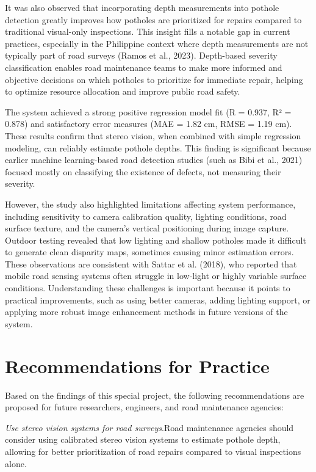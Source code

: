 It was also observed that incorporating depth measurements into pothole detection greatly improves how potholes are prioritized for repairs compared to traditional visual-only inspections. This insight fills a notable gap in current practices, especially in the Philippine context where depth measurements are not typically part of road surveys (Ramos et al., 2023). Depth-based severity classification enables road maintenance teams to make more informed and objective decisions on which potholes to prioritize for immediate repair, helping to optimize resource allocation and improve public road safety.

The system achieved a strong positive regression model fit (R = 0.937, R² = 0.878) and satisfactory error measures (MAE = 1.82 cm, RMSE = 1.19 cm). These results confirm that stereo vision, when combined with simple regression modeling, can reliably estimate pothole depths. This finding is significant because earlier machine learning-based road detection studies (such as Bibi et al., 2021) focused mostly on classifying the existence of defects, not measuring their severity.

However, the study also highlighted limitations affecting system performance, including sensitivity to camera calibration quality, lighting conditions, road surface texture, and the camera's vertical positioning during image capture. Outdoor testing revealed that low lighting and shallow potholes made it difficult to generate clean disparity maps, sometimes causing minor estimation errors. These observations are consistent with Sattar et al. (2018), who reported that mobile road sensing systems often struggle in low-light or highly variable surface conditions. Understanding these challenges is important because it points to practical improvements, such as using better cameras, adding lighting support, or applying more robust image enhancement methods in future versions of the system.

\section{Recommendations for Practice}
Based on the findings of this special project, the following recommendations are proposed for future researchers, engineers, and road maintenance agencies:

\textit {Use stereo vision systems for road surveys}.Road maintenance agencies should consider using calibrated stereo vision systems to estimate pothole depth, allowing for better prioritization of road repairs compared to visual inspections alone.

